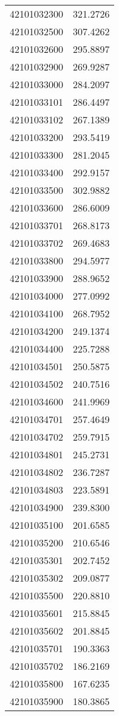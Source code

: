 \begin{longtable}[t]{lr}
42101032300 & 321.2726\\
42101032500 & 307.4262\\
42101032600 & 295.8897\\
42101032900 & 269.9287\\
42101033000 & 284.2097\\
42101033101 & 286.4497\\
42101033102 & 267.1389\\
42101033200 & 293.5419\\
42101033300 & 281.2045\\
42101033400 & 292.9157\\
42101033500 & 302.9882\\
42101033600 & 286.6009\\
42101033701 & 268.8173\\
42101033702 & 269.4683\\
42101033800 & 294.5977\\
42101033900 & 288.9652\\
42101034000 & 277.0992\\
42101034100 & 268.7952\\
42101034200 & 249.1374\\
42101034400 & 225.7288\\
42101034501 & 250.5875\\
42101034502 & 240.7516\\
42101034600 & 241.9969\\
42101034701 & 257.4649\\
42101034702 & 259.7915\\
42101034801 & 245.2731\\
42101034802 & 236.7287\\
42101034803 & 223.5891\\
42101034900 & 239.8300\\
42101035100 & 201.6585\\
42101035200 & 210.6546\\
42101035301 & 202.7452\\
42101035302 & 209.0877\\
42101035500 & 220.8810\\
42101035601 & 215.8845\\
42101035602 & 201.8845\\
42101035701 & 190.3363\\
42101035702 & 186.2169\\
42101035800 & 167.6235\\
42101035900 & 180.3865\\

\end{longtable}
